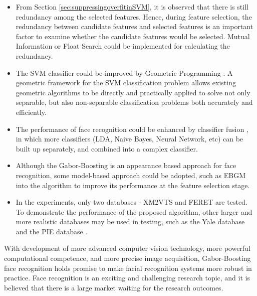 \begin{itemize}
\item From \mbox{Section} \ref{sec:suppressingoverfitinSVM}, it is observed that there is still redundancy among the selected features. Hence, during feature selection, the redundancy between candidate features and selected features is an important factor to examine whether the candidate features would be selected. Mutual Information \cite{Shen2005,Shen2006} or Float Search \cite{Pudil1994,LiStan2004} could be implemented for calculating the redundancy.
\item The SVM classifier could be improved by Geometric Programming \cite{Mavroforakis2006}. A geometric framework for the SVM classification problem allows existing geometric algorithms to be directly and practically applied to solve not only separable, but also non-separable classification problems both accurately and efficiently.
\item The performance of face recognition could be enhanced by classifier fusion \cite{Lu2003}, in which more classifiers (\mbox{LDA}, Naive Bayes, Neural Network, etc) can be built up separately, and combined into a complex classifier. 
\item Although the Gabor-Boosting is an appearance based approach for face recognition, some model-based approach could be adopted, such as \mbox{EBGM} \cite{Wiskott1997} into the algorithm to improve its performance at the feature selection stage.
\item In the experiments, only two databases - \mbox{XM2VTS} and \mbox{FERET} are tested. To demonstrate the performance of the proposed algorithm, other larger and more realistic databases may be used in testing, such as the Yale database \cite{Georghiades2001} and the PIE database \cite{Sim2003}. 
\end{itemize}
With development of more advanced computer vision technology, more powerful computational competence, and more precise image acquisition, Gabor-Boosting face recognition holds promise to make facial recognition systems more robust in practice. Face recognition is an exciting and challenging research topic, and it is believed that there is a  large market waiting for the research outcomes.
